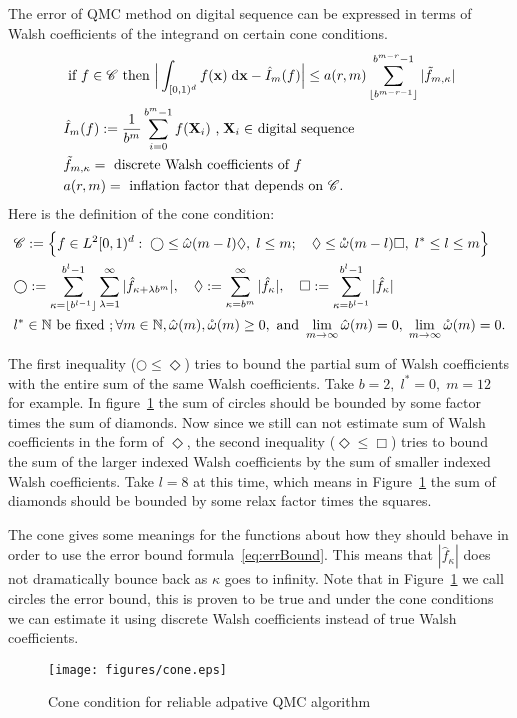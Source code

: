 The error of QMC method on digital sequence can be expressed in terms of Walsh coefficients of the integrand on certain cone conditions. 
\begin{align}
    \label{eq:errBound}
    &\text{ if } f \in \mathscr{C}\text{ then } \Big|\int_{[0,1)^d}f(\mathbf{x})\;\textrm{d}\mathbf{x} - \hat{I}_m(f)\Big| \leq a(r,m) \sum_{\lfloor b^{m-r-1} \rfloor}^{b^{m-r}-1} |\tilde{f}_{m,\kappa}|\\
    &\hat{I}_m(f): = \frac{1}{b^m}\sum_{i=0}^{b^m-1}f(\mathbf{X}_i)
    \text{ ,$\;\mathbf{X}_i\in$ digital sequence}\notag\\
    &\tilde{f}_{m,\kappa}=\text{ discrete Walsh coefficients of }f \notag\\
    &a(r,m) =\text{ inflation factor that depends on } \mathscr{C} \notag.
\end{align}
Here is the definition of the cone condition:
\begin{align}
   &\mathscr{C}:=\Big\{f\in L^2[0,1)^d:\;\bigcirc \leq \hat{\omega}(m-l)\Diamond,\; l\leq m;\quad
   \Diamond \leq \mathring{\omega}(m-l) \Box, 
   \; l^*\leq l \leq m\Big\}\notag\\
   \label{eq:cone}
   &\bigcirc:= \sum_{\kappa=\lfloor b^{l-1} \rfloor}^{b^l-1} \sum_{\lambda=1}^{\infty}| \hat{f}_{\kappa+\lambda b^m}|,\quad  
   \Diamond:=\sum_{\kappa=b^m}^{\infty}|\hat{f}_{\kappa}|,\quad
   \Box:= \sum_{\kappa=b^{l-1}}^{b^l-1}|\hat{f}_\kappa|\\
   &l^*\in \mathbb{N}\text{ be fixed }; \forall m\in \mathbb{N},\hat{\omega}(m),\mathring{\omega}(m)\geq 0, \text{ and } \lim_{m\to \infty} \hat{\omega}(m)=0,\; \lim_{m\to \infty} \mathring{\omega}(m)=0\notag.
\end{align}

The first inequality ($\bigcirc \leq \Diamond$) tries to bound the partial sum of Walsh coefficients with the entire sum of the same Walsh coefficients. 
Take $b=2,\; l^*=0,\; m=12$ for example. 
In figure~\ref{fg:cone} the sum of circles should be bounded by some factor times the sum of diamonds. 
Now since we still can not estimate sum of Walsh coefficients in the form of $\Diamond$, the second inequality ($\Diamond\leq \Box$) tries to bound the sum of the larger indexed Walsh coefficients by the sum of smaller indexed Walsh coefficients. 
Take $l=8$ at this time, which means in Figure~\ref{fg:cone} the sum of diamonds should be bounded by some relax factor times the squares.

The cone gives some meanings for the functions about how they should behave in order to use the error bound formula~\eqref{eq:errBound}. 
This means that $|\hat{f}_\kappa|$ does not dramatically bounce back as $\kappa$ goes to infinity. 
Note that in Figure~\ref{fg:cone} we call circles the error bound, this is proven to be true and under the cone conditions we can estimate it using discrete Walsh coefficients instead of true Walsh coefficients.
\begin{figure}[h]
    \centering
    \texttt{[image: figures/cone.eps]}
    \caption{Cone condition for reliable adpative QMC algorithm}
    \label{fg:cone}
\end{figure}

